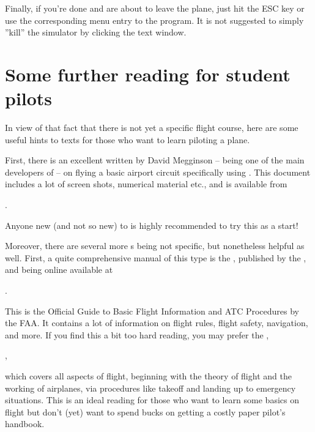 Finally, if you're done and are about to leave the plane, just hit the ESC key or use the
corresponding menu entry to  the program. It is not suggested to simply
''kill'' the simulator by clicking the text window.

\section{Some further reading for student pilots\label{flightschoool}}

In view of that fact that there is not yet a \FlightGear{} specific flight course, here
are some useful hints to texts for those who want to learn piloting a plane.

First, there is an excellent  written by David Megginson -- being one of the main developers of \FlightGear{} --  on flying a basic airport circuit specifically using \FlightGear{}. This document includes a lot of screen shots, numerical material etc., and is available from
\medskip

.
\medskip

\noindent
Anyone new (and not so new) to \FlightGear{} is highly recommended to try this as a start!

Moreover, there are several more s being not \FlightGear{} specific, but nonetheless helpful as well. First, a quite comprehensive manual of this type is the , published by the , and being online available at
\medskip

.
\medskip

 \noindent
This is the Official Guide to Basic Flight Information and ATC Procedures by the FAA. It
contains a lot of information on flight rules, flight safety, navigation, and more. If
you find this a bit too hard reading, you may prefer the ,
\medskip

,
\medskip

 \noindent
which covers all aspects of flight, beginning with the theory of flight and the working
of airplanes, via procedures like takeoff and landing up to emergency situations. This is
an ideal reading for those who want to learn some basics on flight but don't (yet) want
to spend bucks on getting a costly paper pilot's handbook.

